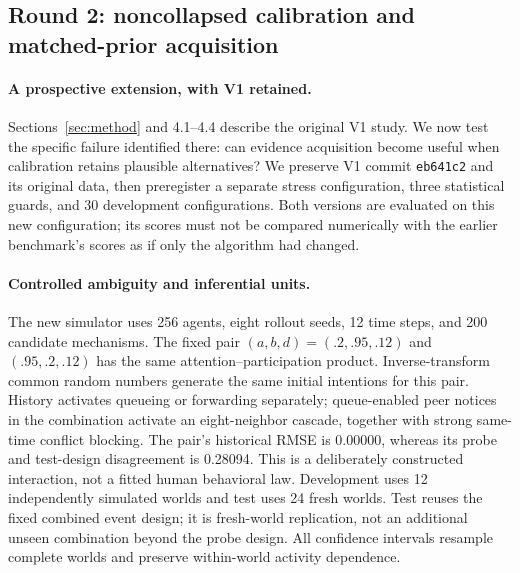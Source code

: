 \subsection{Round 2: noncollapsed calibration and matched-prior acquisition}
\label{sec:round2}
\paragraph{A prospective extension, with V1 retained.}
Sections~\ref{sec:method} and 4.1--4.4 describe the original V1 study. We now test the specific failure identified there: can evidence acquisition become useful when calibration retains plausible alternatives? We preserve V1 commit \texttt{eb641c2} and its original data, then preregister a separate stress configuration, three statistical guards, and 30 development configurations. Both versions are evaluated on this new configuration; its scores must not be compared numerically with the earlier benchmark's scores as if only the algorithm had changed.

\paragraph{Controlled ambiguity and inferential units.}
The new simulator uses 256 agents, eight rollout seeds, 12 time steps, and 200 candidate mechanisms. The fixed pair $(a,b,d)=(.2,.95,.12)$ and $(.95,.2,.12)$ has the same attention--participation product. Inverse-transform common random numbers generate the same initial intentions for this pair. History activates queueing or forwarding separately; queue-enabled peer notices in the combination activate an eight-neighbor cascade, together with strong same-time conflict blocking. The pair's historical RMSE is 0.00000, whereas its probe and test-design disagreement is 0.28094. This is a deliberately constructed interaction, not a fitted human behavioral law. Development uses 12 independently simulated worlds and test uses 24 fresh worlds. Test reuses the fixed combined event design; it is fresh-world replication, not an additional unseen combination beyond the probe design. All confidence intervals resample complete worlds and preserve within-world activity dependence.

